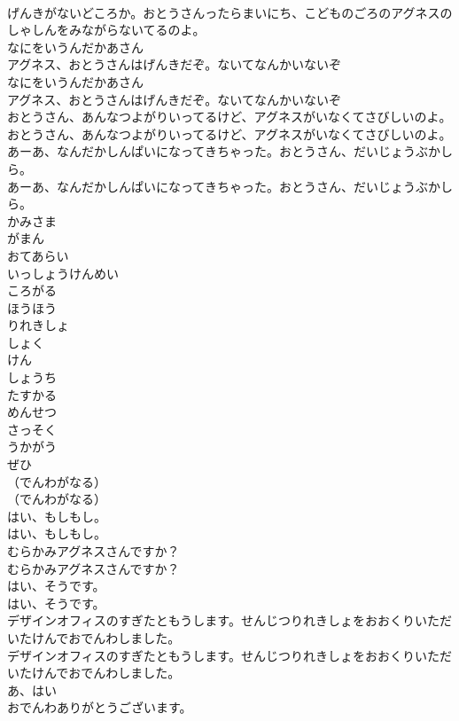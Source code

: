 \documentclass[8pt]{extreport}
\begin{document}
\begin{CJK}{UTF8}{min}
\\	げんきがないどころか。おとうさんったらまいにち、こどものごろのアグネスのしゃしんをみながらないてるのよ。
\\	なにをいうんだかあさん
\\	アグネス、おとうさんはげんきだぞ。ないてなんかいないぞ
\\	なにをいうんだかあさん
\\	アグネス、おとうさんはげんきだぞ。ないてなんかいないぞ
\\	おとうさん、あんなつよがりいってるけど、アグネスがいなくてさびしいのよ。
\\	おとうさん、あんなつよがりいってるけど、アグネスがいなくてさびしいのよ。
\\	あーあ、なんだかしんぱいになってきちゃった。おとうさん、だいじょうぶかしら。
\\	あーあ、なんだかしんぱいになってきちゃった。おとうさん、だいじょうぶかしら。
\\	かみさま
\\	がまん
\\	おてあらい
\\	いっしょうけんめい
\\	ころがる
\\	ほうほう
\\	りれきしょ
\\	しょく
\\	けん
\\	しょうち
\\	たすかる
\\	めんせつ
\\	さっそく
\\	うかがう
\\	ぜひ
\\	（でんわがなる）
\\	（でんわがなる）
\\	はい、もしもし。
\\	はい、もしもし。
\\	むらかみアグネスさんですか？
\\	むらかみアグネスさんですか？
\\	はい、そうです。
\\	はい、そうです。
\\	デザインオフィスのすぎたともうします。せんじつりれきしょをおおくりいただいたけんでおでんわしました。
\\	デザインオフィスのすぎたともうします。せんじつりれきしょをおおくりいただいたけんでおでんわしました。
\\	あ、はい
\\	おでんわありがとうございます。

\end{CJK}
\end{document}
